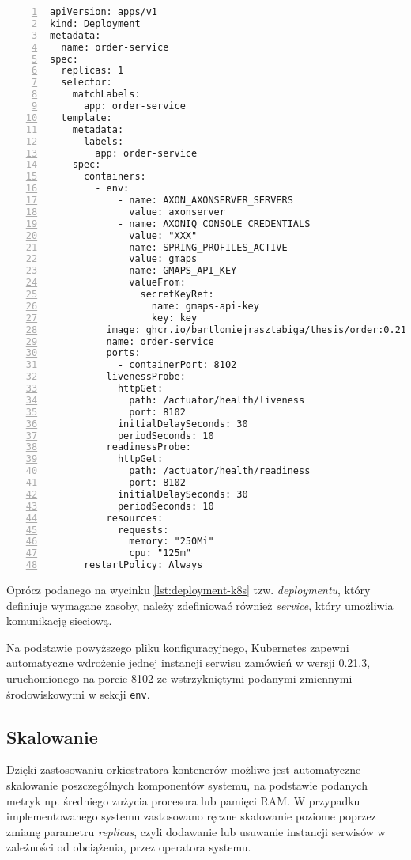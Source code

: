 \begin{lstlisting}[caption={Fragment pliku konfiguracyjnego Kubernetes dla serwisu zamówień},label={lst:deployment-k8s},captionpos=b,numbers=left]
apiVersion: apps/v1
kind: Deployment
metadata:
  name: order-service
spec:
  replicas: 1
  selector:
    matchLabels:
      app: order-service
  template:
    metadata:
      labels:
        app: order-service
    spec:
      containers:
        - env:
            - name: AXON_AXONSERVER_SERVERS
              value: axonserver
            - name: AXONIQ_CONSOLE_CREDENTIALS
              value: "XXX"
            - name: SPRING_PROFILES_ACTIVE
              value: gmaps
            - name: GMAPS_API_KEY
              valueFrom:
                secretKeyRef:
                  name: gmaps-api-key
                  key: key
          image: ghcr.io/bartlomiejrasztabiga/thesis/order:0.21.3
          name: order-service
          ports:
            - containerPort: 8102
          livenessProbe:
            httpGet:
              path: /actuator/health/liveness
              port: 8102
            initialDelaySeconds: 30
            periodSeconds: 10
          readinessProbe:
            httpGet:
              path: /actuator/health/readiness
              port: 8102
            initialDelaySeconds: 30
            periodSeconds: 10
          resources:
            requests:
              memory: "250Mi"
              cpu: "125m"
      restartPolicy: Always
\end{lstlisting}

Oprócz podanego na wycinku \ref{lst:deployment-k8s} tzw. \textit{deploymentu}, który definiuje wymagane zasoby, należy zdefiniować również \textit{service}, który umożliwia komunikację sieciową.

Na podstawie powyższego pliku konfiguracyjnego, Kubernetes zapewni automatyczne wdrożenie jednej instancji serwisu zamówień w wersji 0.21.3, uruchomionego na porcie 8102 ze wstrzykniętymi podanymi zmiennymi środowiskowymi w sekcji \texttt{env}.

\subsection{Skalowanie}

Dzięki zastosowaniu orkiestratora kontenerów możliwe jest automatyczne skalowanie poszczególnych komponentów systemu, na podstawie podanych metryk np. średniego zużycia procesora lub pamięci RAM. W przypadku implementowanego systemu zastosowano ręczne skalowanie poziome poprzez zmianę parametru \textit{replicas}, czyli dodawanie lub usuwanie instancji serwisów w zależności od obciążenia, przez operatora systemu.

